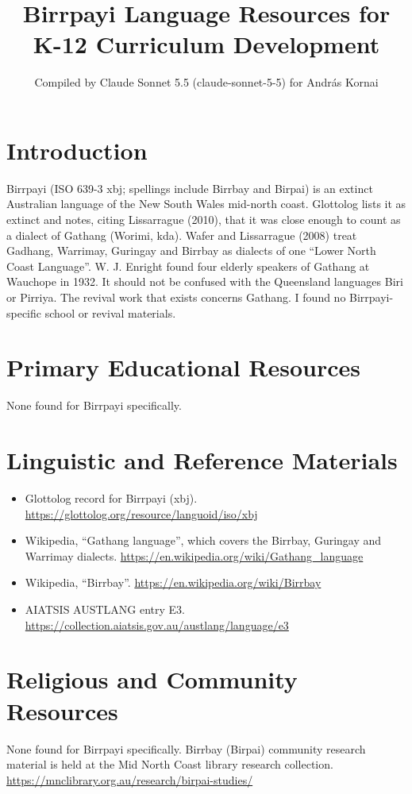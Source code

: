 \documentclass[12pt]{article}
\title{Birrpayi Language Resources for K-12 Curriculum Development}
\author{Compiled by Claude Sonnet 5.5 (claude-sonnet-5-5) for Andr\'as Kornai}
\date{}
\begin{document}
\maketitle

\section{Introduction}
Birrpayi (ISO 639-3 xbj; spellings include Birrbay and Birpai) is an extinct Australian language of the New South Wales mid-north coast. Glottolog lists it as extinct and notes, citing Lissarrague (2010), that it was close enough to count as a dialect of Gathang (Worimi, kda). Wafer and Lissarrague (2008) treat Gadhang, Warrimay, Guringay and Birrbay as dialects of one ``Lower North Coast Language''. W. J. Enright found four elderly speakers of Gathang at Wauchope in 1932. It should not be confused with the Queensland languages Biri or Pirriya. The revival work that exists concerns Gathang. I found no Birrpayi-specific school or revival materials.

\section{Primary Educational Resources}
None found for Birrpayi specifically.

\section{Linguistic and Reference Materials}
\begin{itemize}
\item Glottolog record for Birrpayi (xbj). \url{https://glottolog.org/resource/languoid/iso/xbj}
\item Wikipedia, ``Gathang language'', which covers the Birrbay, Guringay and Warrimay dialects. \url{https://en.wikipedia.org/wiki/Gathang_language}
\item Wikipedia, ``Birrbay''. \url{https://en.wikipedia.org/wiki/Birrbay}
\item AIATSIS AUSTLANG entry E3. \url{https://collection.aiatsis.gov.au/austlang/language/e3}
\end{itemize}

\section{Religious and Community Resources}
None found for Birrpayi specifically. Birrbay (Birpai) community research material is held at the Mid North Coast library research collection. \url{https://mnclibrary.org.au/research/birpai-studies/}
\end{document}
